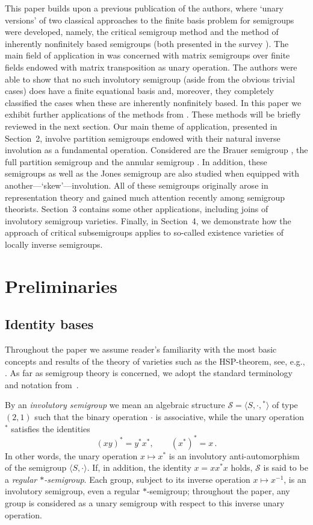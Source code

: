 \documentclass[preprint,1p,times]{elsarticle}
\numberwithin{equation}{section}
\theoremstyle{remark}
\begin{document}
This paper builds upon a previous publication \cite{adv} of the authors, where `unary versions' of two classical
approaches to the finite basis problem for semigroups were developed, namely, the critical semigroup method and the
method of inherently nonfinitely based semigroups (both presented in the survey \cite{volkovjaponicae}). The main field
of application in \cite{adv} was concerned with matrix semigroups over finite fields endowed with matrix transposition
as unary operation. The authors were able to show that no such involutory semigroup (aside from the obvious trivial
cases) does have a finite equational basis and, moreover, they completely classified the cases when these are
inherently nonfinitely based. In this paper we exhibit further applications of the methods from \cite{adv}. These
methods will be briefly reviewed in the next section. Our main theme of application, presented in Section~2, involve
partition semigroups endowed with their natural inverse involution as a fundamental operation. Considered are the
Brauer semigroup \cite{brauer}, the full partition semigroup \cite{martin} and the annular semigroup \cite{jones}. In
addition, these semigroups as well as the Jones semigroup \cite{temperleylieb} are also studied when equipped with
another---`skew'---involution. All of these semigroups originally arose in representation theory and gained much
attention recently among semigroup theorists. Section~3 contains some other applications, including joins of involutory
semigroup varieties. Finally, in Section~4, we demonstrate how the approach of critical subsemigroups applies to
so-called existence varieties of locally inverse semigroups.

\section{Preliminaries}

\subsection{Identity bases}

Throughout the paper we assume reader's familiarity with the most basic concepts and results of the theory of varieties
such as the HSP-theorem, see, e.g., \cite[Chapter~II]{BuSa81}. As far as semi\-group theory is concerned, we adopt the
standard terminology and notation from~\cite{CP}.

By an \emph{involutory semigroup} we mean an algebraic structure $\mathcal{S}=\langle S,\cdot,{}^*\rangle$ of type
$(2,1)$ such that the binary operation $\cdot$ is associative, while the unary operation ${}^*$ satisfies the
identities
$$
(xy)^* = y^*x^*,\qquad (x^*)^*= x\,.
$$
In other words, the unary operation $x\mapsto x^*$ is an involutory anti-automorphism of the semigroup $\langle
S,\cdot\rangle$. If, in addition, the identity $x=xx^*x$ holds, $\mathcal{S}$ is said to be a \emph{regular
$*$-semigroup}. Each group, subject to its inverse operation $x\mapsto x^{-1}$, is an involutory semigroup, even a
regular $*$-semigroup; throughout the paper, any group is considered as a unary semigroup with respect to this inverse
unary operation.
\end{document}
